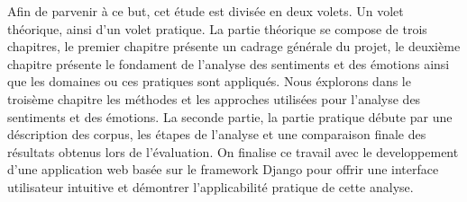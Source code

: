 Afin de parvenir à ce but, cet étude est divisée en deux volets. Un volet théorique, ainsi d'un volet pratique. La partie théorique se compose de trois chapitres, le premier chapitre présente un cadrage générale du projet, le deuxième chapitre présente le fondament de l'analyse des sentiments et des émotions ainsi que les domaines ou ces pratiques sont appliqués. Nous éxplorons dans le troisème chapitre les méthodes et les approches utilisées pour l'analyse des sentiments et des émotions. La seconde partie, la partie pratique débute par une déscription des corpus, les étapes de l'analyse et une comparaison finale des résultats obtenus lors de l'évaluation. On finalise ce travail avec le developpement d'une application web basée sur le framework Django pour offrir une interface utilisateur intuitive et démontrer l'applicabilité pratique de cette analyse. 